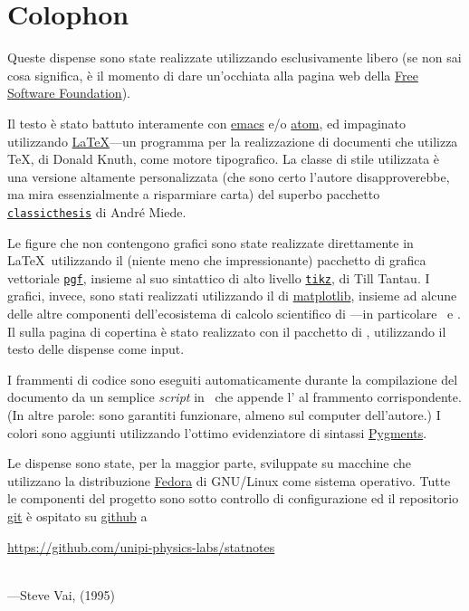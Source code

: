 \chapter*{Colophon}

Queste dispense sono state realizzate utilizzando esclusivamente 
libero (se non sai cosa significa, è il momento di dare un'occhiata alla
pagina web della \href{http://www.fsf.org/}{Free Software Foundation}).

Il testo è stato battuto interamente con
\href{https://www.gnu.org/software/emacs/}{emacs} e/o \href{https://atom.io/}{atom},
ed impaginato utilizzando \href{https://www.latex-project.org/}{\LaTeX}---un programma
per la realizzazione di documenti che utilizza \TeX, di Donald Knuth, come motore
tipografico. La classe di stile utilizzata è una versione altamente
personalizzata (che sono certo l'autore disapproverebbe, ma mira essenzialmente
a risparmiare carta) del superbo pacchetto
\href{http://www.ctan.org/tex-archive/macros/latex/contrib/classicthesis/}{\texttt{classicthesis}} di André Miede.

Le figure che non contengono grafici sono state realizzate direttamente in
\LaTeX\ utilizzando il (niente meno che impressionante) pacchetto di grafica
vettoriale \href{https://www.ctan.org/pkg/pgf}{\texttt{pgf}}, insieme al suo
 sintattico di alto livello
\href{http://www.texample.net/tikz/}{\texttt{tikz}}, di Till Tantau.
I grafici, invece, sono stati realizzati utilizzando il 
 di \href{http://matplotlib.org/}{matplotlib}, insieme ad alcune
delle altre componenti dell'ecosistema di calcolo scientifico di
\python---in particolare \numpy\ e \scipy.
Il  sulla pagina di copertina è stato realizzato con il pacchetto
\href{https://github.com/amueller/word_cloud}{} di \python,
utilizzando il testo delle dispense come input.

I frammenti di codice sono eseguiti automaticamente durante la compilazione
del documento da un semplice \emph{script} in \python\ che appende l'
al frammento corrispondente. (In altre parole: sono garantiti funzionare,
almeno sul computer dell'autore.) I colori sono aggiunti utilizzando
l'ottimo evidenziatore di sintassi \href{http://pygments.org/}{Pygments}.

Le dispense sono state, per la maggior parte, sviluppate su macchine che
utilizzano la distribuzione \href{https://getfedora.org/}{Fedora} di GNU/Linux
come sistema operativo. Tutte le componenti del progetto sono sotto controllo
di configurazione ed il repositorio \href{https://git-scm.com/}{git} è
ospitato su \href{https://github.com}{github} a
\begin{center}
  \url{https://github.com/unipi-physics-labs/statnotes}
\end{center}


\vfill

\noindent{}\\
---Steve Vai,  (1995)

